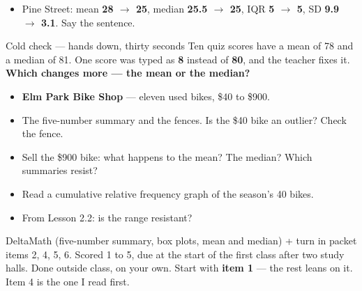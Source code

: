 \documentclass[aspectratio=169, 11pt]{beamer}
\begin{document}
\begin{frame}[t, plain]
  \vspace{4pt}
  \begin{itemize}\setlength{\itemsep}{5pt}
    \item Pine Street: mean \textbf{28 $\to$ 25}, median \textbf{25.5 $\to$ 25}, IQR
          \textbf{5 $\to$ 5}, SD \textbf{9.9 $\to$ 3.1}. Say the sentence.
  \end{itemize}
  \vspace{8pt}
  \begin{block}{Cold check --- hands down, thirty seconds}
    Ten quiz scores have a mean of 78 and a median of 81. One score was typed as \textbf{8}
    instead of \textbf{80}, and the teacher fixes it. \textbf{Which changes more --- the mean
    or the median?}
  \end{block}
\end{frame}

\begin{frame}[t, plain]
  \begin{itemize}\setlength{\itemsep}{4pt}
    \item \textbf{Elm Park Bike Shop} --- eleven used bikes, \$40 to \$900.
    \item The five-number summary and the fences. Is the \$40 bike an outlier? Check the fence.
    \item Sell the \$900 bike: what happens to the mean? The median? Which summaries resist?
    \item Read a cumulative relative frequency graph of the season's 40 bikes.
    \item From Lesson 2.2: is the range resistant?
  \end{itemize}
  \begin{block}{DeltaMath (five-number summary, box plots, mean and median) + turn in packet items 2, 4, 5, 6. Scored 1 to 5, due at the start of the first class after two study halls.}
    Done outside class, on your own. Start with \textbf{item 1} --- the rest leans on it.
    Item 4 is the one I read first.
  \end{block}
\end{frame}
\end{document}
